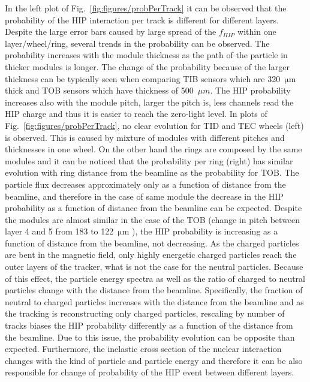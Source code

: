 In the left plot of Fig.~\ref{fig:figures/probPerTrack} it can be observed that the probability of the HIP interaction per track is different for different layers. Despite the large error bars caused by large spread of the $f_{HIP}$ within one layer/wheel/ring, several trends in the probability can be observed. The probability increases with the module thickness as the path of the particle in thicker modules is longer. The change of the probability because of the larger thickness can be typically seen when comparing TIB sensors which are 320~$\mathrm{\mu m}$ thick and TOB sensors which have thickness of 500~$\mu m$. The HIP probability increases also with the module pitch, larger the pitch is, less channels read the HIP charge and thus it is easier to reach the zero-light level. In plots of Fig.~\ref{fig:figures/probPerTrack}, no clear evolution for TID and TEC wheels (left) is observed. This is caused by mixture of modules with different pitches and thicknesses in one wheel. On the other hand the rings are composed by the same modules and it can be noticed that the probability per ring (right) has similar evolution with ring distance from the beamline as the probability for TOB. The particle flux decreases approximately only as a function of distance from the beamline, and therefore in the case of same module the decrease in the HIP probability as a function of distance from the beamline can be expected. Despite the modules are almost similar in the case of the TOB (change in pitch between layer 4 and 5 from 183 to 122~$\mathrm{\mu m}$ ), the HIP probability is increasing as a function of distance from the beamline, not decreasing. As the charged particles are bent in the magnetic field, only highly energetic charged particles reach the outer layers of the tracker, what is not the case for the neutral particles. Because of this effect, the particle energy spectra as well as the ratio of charged to neutral particles change with the distance from the beamline. Specifically, the fraction of neutral to charged particles increases with the distance from the beamline and as the tracking is reconstructing only charged particles, rescaling by number of tracks biases the HIP probability differently as a function of the distance from the beamline. Due to this issue, the probability evolution can be opposite than expected. Furthermore, the inelastic cross section of the nuclear interaction changes with the kind of particle and particle energy and therefore it can be also responsible for change of probability of the HIP event between different layers.  


